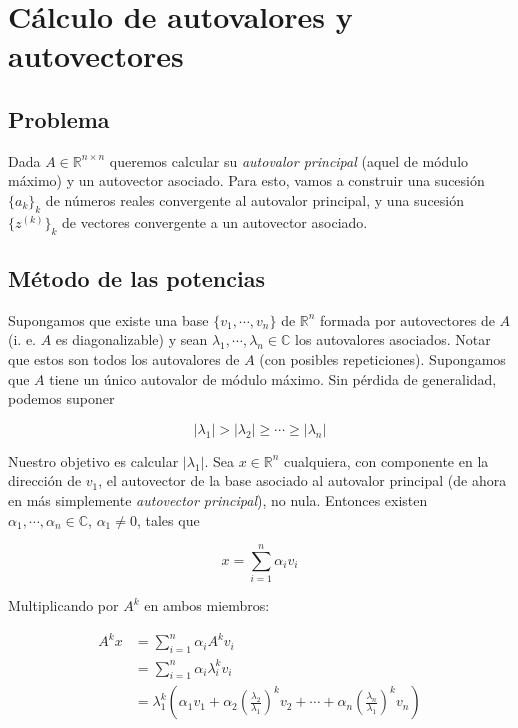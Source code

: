 \section{Cálculo de autovalores y autovectores}

\subsection{Problema}
Dada $A \in \mathbb{R}^{n \times n}$ queremos calcular su \textit{autovalor principal} (aquel de módulo máximo) y un autovector asociado. Para esto, vamos a construir una sucesión $\{a_k\}_k$ de números reales convergente al autovalor principal, y una sucesión $\{z^{(k)}\}_k$ de vectores convergente a un autovector asociado.

\subsection{Método de las potencias}

Supongamos que existe una base $\{v_1, \cdots, v_n\}$ de $\mathbb{R}^n$ formada por autovectores de $A$ (i. e. $A$ es diagonalizable) y sean $\lambda_1, \cdots, \lambda_n \in \mathbb{C}$ los autovalores asociados. Notar que estos son todos los autovalores de $A$ (con posibles repeticiones). Supongamos que $A$ tiene un único autovalor de módulo máximo. Sin pérdida de generalidad, podemos suponer

\[|\lambda_1| > |\lambda_2| \geq \cdots \geq |\lambda_n|\]

Nuestro objetivo es calcular $|\lambda_1|$. Sea $x \in \mathbb{R}^n$ cualquiera, con componente en la dirección de $v_1$, el autovector de la base asociado al autovalor principal (de ahora en más simplemente \textit{autovector principal}), no nula. Entonces existen $\alpha_1, \cdots, \alpha_n \in \mathbb{C}$, $\alpha_1 \neq 0$, tales que

\[x = \sum_{i = 1}^n \alpha_i v_i\]

Multiplicando por $A^k$ en ambos miembros:

\begin{align*}
A^k x &= \sum_{i = 1}^n \alpha_i A^k v_i\\
	&= \sum_{i = 1}^n \alpha_i \lambda_i^k v_i\\
	&= \lambda_1^k \left(\alpha_1 v_1 + \alpha_2 \left(\frac{\lambda_2}{\lambda_1}\right)^k v_2 + \cdots + 
	\alpha_n \left(\frac{\lambda_n}{\lambda_1}\right)^k v_n\right)
\end{align*}

